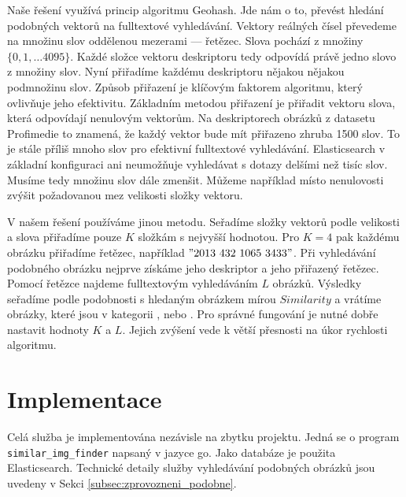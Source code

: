 Naše řešení využívá princip algoritmu Geohash. Jde nám o to, převést hledání podobných vektorů na fulltextové vyhledávání. Vektory reálných čísel převedeme na množinu slov oddělenou mezerami --- řetězec. Slova pochází z množiny $\{0, 1,… 4095\}$. Každé složce vektoru deskriptoru tedy odpovídá právě jedno slovo z množiny slov. Nyní přiřadíme každému deskriptoru nějakou nějakou podmnožinu slov. Způsob přiřazení je klíčovým faktorem algoritmu, který ovlivňuje jeho efektivitu. Základním metodou přiřazení je přiřadit vektoru slova, která odpovídají nenulovým vektorům. Na deskriptorech obrázků z datasetu Profimedie to znamená, že každý vektor bude mít přiřazeno zhruba 1500 slov. To je stále příliš mnoho slov pro efektivní fulltextové vyhledávání. Elasticsearch v základní konfiguraci ani neumožňuje vyhledávat s dotazy delšími než tisíc slov. Musíme tedy množinu slov dále zmenšit. Můžeme například místo nenulovosti zvýšit požadovanou mez velikosti složky vektoru.

V našem řešení používáme jinou metodu. Seřadíme složky vektorů podle velikosti a slova přiřadíme pouze $K$ složkám s nejvyšší hodnotou. Pro $K = 4$ pak každému obrázku přiřadíme řetězec, například $\mathrm{"}2013\ 432\ 1065\ 3433\mathrm{"}$. Při vyhledávání podobného obrázku nejprve získáme jeho deskriptor a jeho přiřazený řetězec. Pomocí řetězce najdeme fulltextovým vyhledáváním $L$ obrázků. Výsledky seřadíme podle podobnosti s hledaným obrázkem mírou $Similarity$ a vrátíme obrázky, které jsou v kategorii , nebo . Pro správné fungování je nutné dobře nastavit hodnoty $K$ a $L$. Jejich zvýšení vede k větší přesnosti na úkor rychlosti algoritmu.

\section{Implementace}

Celá služba je implementována nezávisle na zbytku projektu. Jedná se o program \lstinline{similar_img_finder} napsaný v jazyce go. Jako databáze je použita Elasticsearch. Technické detaily služby vyhledávání podobných obrázků jsou uvedeny v Sekci \ref{subsec:zprovozneni_podobne}.





